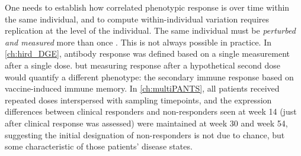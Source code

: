 One needs to establish how correlated phenotypic response is over time within the same individual,
and to compute within-individual variation requires replication at the level of the individual.
The same individual must be \emph{perturbed and measured} more than once \autocite{senn2016MasteringVariationVariance}.
This is not always possible in practice.
In \cref{ch:hird_DGE}, antibody response was defined based on a single measurement after a single dose.
but measuring response after a hypothetical second dose would quantify a different phenotype: 
the secondary immune response based on vaccine-induced immune memory.
In \cref{ch:multiPANTS}, all patients received repeated doses interspersed with sampling timepoints,
and the expression differences between clinical responders and non-responders seen at week 14 (just after clinical response was assessed) were maintained at week 30 and week 54,
suggesting the initial designation of non-responders is not due to chance, but some characteristic of those patients' disease states.
%


